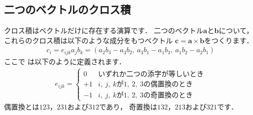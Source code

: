 \subsection{二つのベクトルのクロス積}
\label{ssec:1.3.5}
%
クロス積はベクトルだけに存在する演算です．
二つのベクトル$\bm{a}$と$\bm{b}$について，
これらのクロス積は以下のような成分をもつベクトル
$\bm{c} = \bm{a} \times \bm{b}$をつくります．
\begin{align}
 \label{eq:1.22}
 c_{i} = e_{ijk}a_{j}b_{k}
 = (a_{2}b_{3} - a_{3}b_{2},\ a_{3}b_{1} - a_{1}b_{3},\  a_{1}b_{2} - a_{2}b_{1})
\end{align}
ここで
%
は以下のように定義されます．
\begin{align}
 \label{eq:1.23}
 e_{ijk} =
 \begin{cases}
  0 & \text{いずれか二つの添字が等しいとき} \\
  +1 & \text{$i,\ j,\ k$が$1,\ 2,\ 3$の偶置換のとき} \\
  -1 & \text{$i,\ j,\ k$が$1,\ 2,\ 3$の奇置換のとき}
 \end{cases}
\end{align}
偶置換とは$123$，$231$および$312$であり，
奇置換は$132$，$213$および$321$です．


